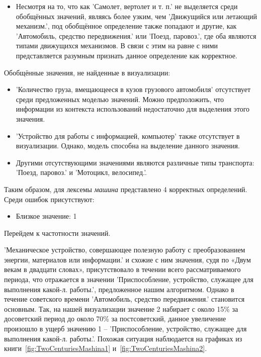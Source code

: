 \begin{itemize}
    \item Несмотря на то, что как ’Самолет, вертолет и т. п.’ не выделяется среди
обобщённых значений, являясь более узким, чем ’Движущийся или летающий механизм.’,
под обобщённое определение также попадают и другие, как ’Автомобиль, средство передвижения.’
или ’Поезд, паровоз.’, где оба являются типами движущихся механизмов.
В связи с этим на равне с ними представляется разумным признать данное определение как корректное.

\end{itemize}

Обобщённые значения, не найденные в визуализации:
\begin{itemize}
    \item ’Количество груза, вмещающееся в кузов грузового автомобиля’ отсутствует среди предложенных моделью значений.
Можно предположить, что информации из контекста использований недостаточно для выделения этого значения.

    \item ’Устройство для работы с информацией, компьютер’ также отсутствует в визуализации.
Однако, модель способна на выделение данного значения.  %

    \item Другими отсутствующими значениями являются различные типы транспорта:
’Поезд, паровоз.’ и ’Мотоцикл, велосипед.’.   %
\end{itemize}

Таким образом, для лексемы \textit{машина} представлено 4 корректных определений.
Среди ошибок присутствуют:
\begin{itemize}
    \item Близкое значение: 1
\end{itemize}

Перейдем к частотности значений.

’Механическое устройство, совершающее полезную работу с преобразованием энергии,
материалов или информации.’ и схожие с ним значения, судя по «Двум векам в двадцати словах»,
присутствовало в течении всего рассматриваемого периода, что отражается в значении
’Приспособление, устройство, служащее для выполнения какой-л. работы.’, предложенное
нашим алгоритмом.
Однако в течение советского времени ’Автомобиль, средство передвижения.’ становится основным.
Так, на нашей визуализации значение 2 набирает с около 15\% за досоветский период
до около 70\% за постсоветский, данное увеличение произошло в ущерб значению 1 –
’Приспособление, устройство, служащее для выполнения какой-л. работы.’.
Похожая ситуация наблюдается на графиках из книги~\ref{fig:TwoCenturiesMashina1} и~\ref{fig:TwoCenturiesMashina2}.

